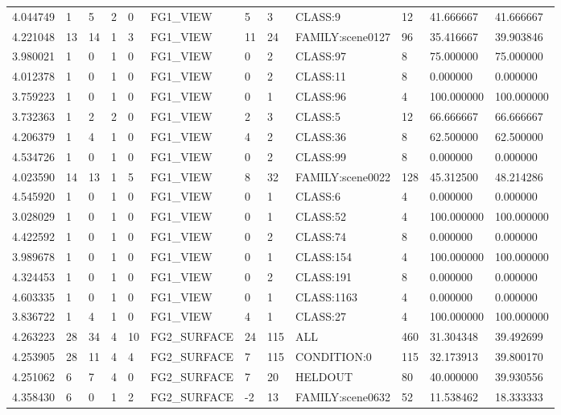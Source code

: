 \begin{tabular}{llllllllllll}
4.044749 & 1 & 5 & 2 & 0 & FG1\_VIEW & 5 & 3 & CLASS:9 & 12 & 41.666667 & 41.666667 \\
4.221048 & 13 & 14 & 1 & 3 & FG1\_VIEW & 11 & 24 & FAMILY:scene0127 & 96 & 35.416667 & 39.903846 \\
3.980021 & 1 & 0 & 1 & 0 & FG1\_VIEW & 0 & 2 & CLASS:97 & 8 & 75.000000 & 75.000000 \\
4.012378 & 1 & 0 & 1 & 0 & FG1\_VIEW & 0 & 2 & CLASS:11 & 8 & 0.000000 & 0.000000 \\
3.759223 & 1 & 0 & 1 & 0 & FG1\_VIEW & 0 & 1 & CLASS:96 & 4 & 100.000000 & 100.000000 \\
3.732363 & 1 & 2 & 2 & 0 & FG1\_VIEW & 2 & 3 & CLASS:5 & 12 & 66.666667 & 66.666667 \\
4.206379 & 1 & 4 & 1 & 0 & FG1\_VIEW & 4 & 2 & CLASS:36 & 8 & 62.500000 & 62.500000 \\
4.534726 & 1 & 0 & 1 & 0 & FG1\_VIEW & 0 & 2 & CLASS:99 & 8 & 0.000000 & 0.000000 \\
4.023590 & 14 & 13 & 1 & 5 & FG1\_VIEW & 8 & 32 & FAMILY:scene0022 & 128 & 45.312500 & 48.214286 \\
4.545920 & 1 & 0 & 1 & 0 & FG1\_VIEW & 0 & 1 & CLASS:6 & 4 & 0.000000 & 0.000000 \\
3.028029 & 1 & 0 & 1 & 0 & FG1\_VIEW & 0 & 1 & CLASS:52 & 4 & 100.000000 & 100.000000 \\
4.422592 & 1 & 0 & 1 & 0 & FG1\_VIEW & 0 & 2 & CLASS:74 & 8 & 0.000000 & 0.000000 \\
3.989678 & 1 & 0 & 1 & 0 & FG1\_VIEW & 0 & 1 & CLASS:154 & 4 & 100.000000 & 100.000000 \\
4.324453 & 1 & 0 & 1 & 0 & FG1\_VIEW & 0 & 2 & CLASS:191 & 8 & 0.000000 & 0.000000 \\
4.603335 & 1 & 0 & 1 & 0 & FG1\_VIEW & 0 & 1 & CLASS:1163 & 4 & 0.000000 & 0.000000 \\
3.836722 & 1 & 4 & 1 & 0 & FG1\_VIEW & 4 & 1 & CLASS:27 & 4 & 100.000000 & 100.000000 \\
4.263223 & 28 & 34 & 4 & 10 & FG2\_SURFACE & 24 & 115 & ALL & 460 & 31.304348 & 39.492699 \\
4.253905 & 28 & 11 & 4 & 4 & FG2\_SURFACE & 7 & 115 & CONDITION:0 & 115 & 32.173913 & 39.800170 \\
4.251062 & 6 & 7 & 4 & 0 & FG2\_SURFACE & 7 & 20 & HELDOUT & 80 & 40.000000 & 39.930556 \\
4.358430 & 6 & 0 & 1 & 2 & FG2\_SURFACE & -2 & 13 & FAMILY:scene0632 & 52 & 11.538462 & 18.333333 \\

\end{tabular}
